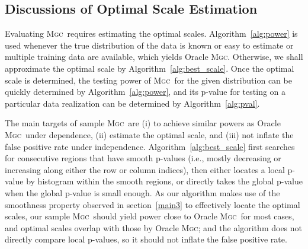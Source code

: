 \documentclass[11pt]{article}
\providecommand{\sct}[1]{{\normalfont\textsc{#1}}}
\newcommand{\Mgc}{\sct{Mgc}}
\begin{document}
\clearpage
\subsection{Discussions of Optimal Scale Estimation}
\label{appen:diss}
Evaluating \Mgc~requires estimating the optimal scales. Algorithm~\ref{alg:power} is used whenever the true distribution of the data is known or easy to estimate or multiple training data are available, which yields Oracle \Mgc. Otherwise, we shall approximate the optimal scale by Algorithm~\ref{alg:best_scale}. Once the optimal scale is determined, the testing power of \Mgc~for the given distribution can be quickly determined by Algorithm~\ref{alg:power}, and its p-value for testing on a particular data realization can be determined by Algorithm~\ref{alg:pval}.

The main targets of sample \Mgc~are (i) to achieve similar powers as Oracle \Mgc~under dependence, (ii) estimate the optimal scale, and (iii) not inflate the false positive rate under independence. Algorithm~\ref{alg:best_scale} first searches for consecutive regions that have smooth p-values (i.e., mostly decreasing or increasing along either the row or column indices), then either locates a local p-value by histogram within the smooth regions, or directly takes the global p-value when the global p-value is small enough. As our algorithm makes use of the smoothness property observed in section~\ref{main3} to effectively locate the optimal scales, our sample \Mgc~should yield power close to Oracle \Mgc~for most cases, and optimal scales overlap with those by Oracle \Mgc; and the algorithm does not directly compare local p-values, so it should not inflate the false positive rate.
\end{document}
